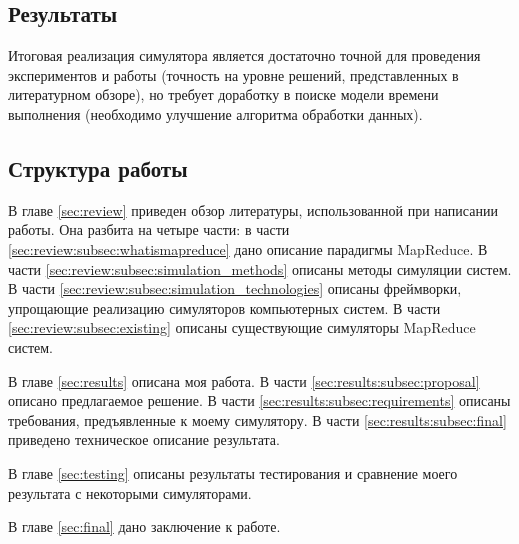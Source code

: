 \documentclass[../diploma.tex]{subfile}
\begin{document}
    \subsection{Результаты}

    Итоговая реализация симулятора является достаточно точной для проведения
    экспериментов и работы (точность на уровне решений, представленных в
    литературном обзоре), но требует доработку в поиске модели времени
    выполнения (необходимо улучшение алгоритма обработки данных).

    \subsection{Структура работы}
    В главе \ref{sec:review} приведен обзор литературы, использованной при
    написании работы. Она разбита на четыре части: в части
    \ref{sec:review:subsec:whatismapreduce} дано описание парадигмы MapReduce. В части
    \ref{sec:review:subsec:simulation_methods} описаны методы симуляции систем.
    В части \ref{sec:review:subsec:simulation_technologies} описаны фреймворки,
    упрощающие реализацию симуляторов компьютерных систем. В части
    \ref{sec:review:subsec:existing} описаны существующие симуляторы MapReduce
    систем. 

    В главе \ref{sec:results} описана моя работа. В части
    \ref{sec:results:subsec:proposal} описано предлагаемое решение. В части
    \ref{sec:results:subsec:requirements} описаны требования, предъявленные к
    моему симулятору. В части \ref{sec:results:subsec:final} приведено
    техническое описание результата.

    В главе \ref{sec:testing} описаны результаты тестирования и сравнение моего
    результата с некоторыми симуляторами.

    В главе \ref{sec:final} дано заключение к работе.
    
\end{document}
